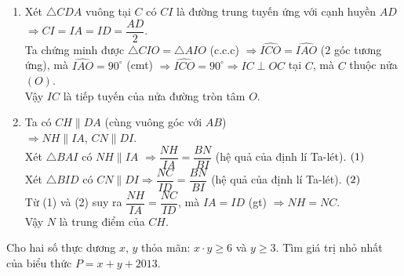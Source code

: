 \begin{bt}
{\begin{enumerate}[1)]
{	}
Ta có $AD$ là tiếp tuyến của nửa ($O$) tại $A \Rightarrow \widehat{BAD} = 90^\circ$.\\
Xét $\triangle ABD$ vuông tại $A$, có $AC$ là đường cao $\Rightarrow BC\cdot BD = AB^2$ (hệ thức lượng trong tam giác vuông)
$\Rightarrow BC\cdot BD = (2R)^2 = 4R^2$. 
\item Xét $\triangle CDA$ vuông tại $C$ có $CI$ là đường trung tuyến ứng với cạnh huyền $AD$\\
$\Rightarrow CI = IA = ID = \dfrac{AD}{2}$.\\
Ta chứng minh được $\triangle CIO = \triangle AIO$ (c.c.c) 
$\Rightarrow \widehat{ICO} = \widehat{IAO}$ ($2$ góc tương ứng),
mà $\widehat{IAO} = 90^\circ$ (cmt)
$\Rightarrow \widehat{ICO} = 90^\circ \Rightarrow IC \perp OC$ tại $C$, mà $C$ thuộc nửa $(O)$.\\
Vậy $IC$ là tiếp tuyến của nửa đường tròn tâm $O$.
\item Ta có $CH \parallel DA$ (cùng vuông góc với $AB$)\\
$\Rightarrow NH \parallel IA$, $CN \parallel DI$.\\
Xét $\triangle BAI$ có $NH \parallel IA$
$\Rightarrow \dfrac{NH}{IA} = \dfrac{BN}{BI}$ (hệ quả của định lí Ta-lét). $\hfill{(1)}$\\
Xét $\triangle BID$ có $CN \parallel DI \Rightarrow \dfrac{NC}{ID} = \dfrac{BN}{BI}$ (hệ quả của định lí Ta-lét). $\hfill{(2)}$\\
Từ (1) và (2) suy ra $\dfrac{NH}{IA} = \dfrac{NC}{ID}$, mà $IA = ID$ (gt)
$\Rightarrow NH = NC$.\\
 Vậy $N$ là trung điểm của $CH$.
\end{enumerate}
	}
\end{bt}



\begin{bt}%
Cho hai số thực dương $x$, $y$ thỏa mãn: $x\cdot y \geq 6$ và $y \geq 3$. Tìm giá trị nhỏ nhất của biểu thức $P = x + y + 2013$.
	\end{bt}

